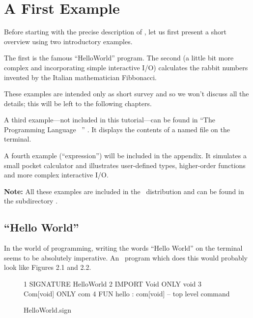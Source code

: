 \chapter{A First Example}
\label{chap:example}
\novice
Before starting with the precise description of \opal,  let us first present
a short overview using two introductory examples.

The first is the famous ``HelloWorld'' program. 
The second (a little bit more complex and incorporating simple interactive I/O)
calculates the rabbit numbers invented by the Italian mathematician
Fibbonacci.

These examples are intended only as  short survey and so we won't
discuss all the details; this will be left to the following chapters.

\advanced A third example---not included in this tutorial---can be found in
``The Programming Language \opal\ '' \cite[p.~27]{Pe}. 
It displays the contents of a named file on the terminal.

 A fourth example (``expression'') will be included in the
appendix. 
It simulates a small pocket calculator and illustrates user-defined
types, higher-order functions and more complex interactive I/O.

\medskip
\novice
{\mbox{\bf Note:}} All these examples are included in the
\opal\ distribution and can be found in the subdirectory .

\section{``Hello World''}
\novice
In the world of programming, writing the words ``Hello World'' on the
terminal seems to be absolutely imperative.
An \opal\ program which does  this would probably look like Figures 2.1
and 2.2.
\begin{figure}[htbp]
  \leavevmode
  \begin{prog}
    1    SIGNATURE HelloWorld
    2    IMPORT  Void            ONLY void
    3            Com[void]       ONLY com
    4    FUN hello : com[void]    -- top level command\end{prog}
  \caption{HelloWorld.sign}
\end{figure}

